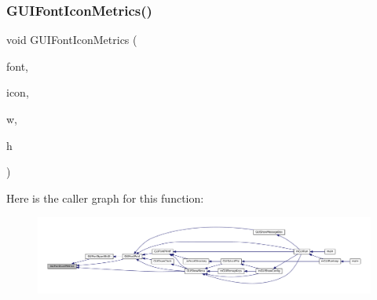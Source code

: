 \subsubsection{\texorpdfstring{G\+U\+I\+Font\+Icon\+Metrics()}{GUIFontIconMetrics()}}
{\footnotesize\ttfamily void G\+U\+I\+Font\+Icon\+Metrics (\begin{DoxyParamCaption}\item[{const struct G\+U\+I\+Font $\ast$}]{font,  }\item[{enum G\+U\+I\+Icon}]{icon,  }\item[{unsigned $\ast$}]{w,  }\item[{unsigned $\ast$}]{h }\end{DoxyParamCaption})}

Here is the caller graph for this function\+:
\nopagebreak
\begin{figure}[H]
\begin{center}
\leavevmode
\includegraphics[width=350pt]{3ds_2gui-font_8c_a70534a7637eda192a15884d8930a61b8_icgraph}
\end{center}
\end{figure}

